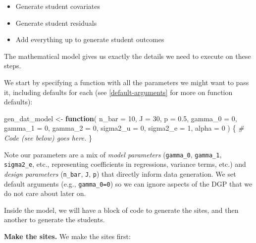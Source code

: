 \documentclass[
]{book}
\newenvironment{Shaded}{\begin{snugshade}}{\end{snugshade}}
\newcommand{\AttributeTok}[1]{\textcolor[rgb]{0.13,0.29,0.53}{#1}}
\newcommand{\CommentTok}[1]{\textcolor[rgb]{0.56,0.35,0.01}{\textit{#1}}}
\newcommand{\ControlFlowTok}[1]{\textcolor[rgb]{0.13,0.29,0.53}{\textbf{#1}}}
\newcommand{\DecValTok}[1]{\textcolor[rgb]{0.00,0.00,0.81}{#1}}
\newcommand{\FloatTok}[1]{\textcolor[rgb]{0.00,0.00,0.81}{#1}}
\newcommand{\NormalTok}[1]{#1}
\newcommand{\OtherTok}[1]{\textcolor[rgb]{0.56,0.35,0.01}{#1}}
\providecommand{\tightlist}{%
  \setlength{\itemsep}{0pt}\setlength{\parskip}{0pt}}
\begin{document}
\begin{itemize}
\tightlist
\item
  Generate student covariates
\item
  Generate student residuals
\item
  Add everything up to generate student outcomes
\end{itemize}

The mathematical model gives us exactly the details we need to execute on these steps.

We start by specifying a function with all the parameters we might want to pass it, including defaults for each (see \ref{default-arguments} for more on function defaults):

\begin{Shaded}
\begin{Highlighting}[]
\NormalTok{gen\_dat\_model }\OtherTok{\textless{}{-}} \ControlFlowTok{function}\NormalTok{( }\AttributeTok{n\_bar =} \DecValTok{10}\NormalTok{,}
                           \AttributeTok{J =} \DecValTok{30}\NormalTok{,}
                           \AttributeTok{p =} \FloatTok{0.5}\NormalTok{,}
                           \AttributeTok{gamma\_0 =} \DecValTok{0}\NormalTok{, }\AttributeTok{gamma\_1 =} \DecValTok{0}\NormalTok{, }\AttributeTok{gamma\_2 =} \DecValTok{0}\NormalTok{,}
                           \AttributeTok{sigma2\_u =} \DecValTok{0}\NormalTok{, }\AttributeTok{sigma2\_e =} \DecValTok{1}\NormalTok{,}
                           \AttributeTok{alpha =} \DecValTok{0}\NormalTok{ ) \{}
  \CommentTok{\# Code (see below) goes here.}
\NormalTok{\}}
\end{Highlighting}
\end{Shaded}

Note our parameters are a mix of \emph{model parameters} (\texttt{gamma\_0}, \texttt{gamma\_1}, \texttt{sigma2\_e}, etc., representing coefficients in regressions, variance terms, etc.) and \emph{design parameters} (\texttt{n\_bar}, \texttt{J}, \texttt{p}) that directly inform data generation.
We set default arguments (e.g., \texttt{gamma\_0=0}) so we can ignore aspects of the DGP that we do not care about later on.

Inside the model, we will have a block of code to generate the sites, and then another to generate the students.

\textbf{Make the sites.}
We make the sites first:
\end{document}
